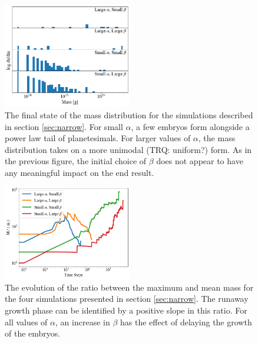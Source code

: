 \documentclass[twocolumn]{aastex63}
\begin{document}
\begin{figure}
\begin{center}
    \includegraphics[width=0.5\textwidth]{figures/alpha_beta_mass.png}
    \caption{The final state of the mass distribution for the
      simulations described in section \ref{sec:narrow}. For small
      $\alpha$, a few embryos form alongside a power law tail of
      planetesimals. For larger values of $\alpha$, the mass
      distribution takes on a more unimodal (TRQ: uniform?) form. As in the previous figure, the initial choice of $\beta$ does not appear to have any meaningful impact on the end result.\label{fig:alpha_beta_mass}}
\end{center}
\end{figure}

\begin{figure}
\begin{center}
    \includegraphics[width=0.5\textwidth]{figures/alpha_beta_evo.png}
    \caption{The evolution of the ratio between the maximum and mean mass for the four simulations presented in section \ref{sec:narrow}. The runaway growth phase can be identified by a positive slope in this ratio. For all values of $\alpha$, an increase in $\beta$ has the effect of delaying the growth of the embryos.\label{fig:alpha_beta_evo}}
\end{center}
\end{figure}

\end{document}
